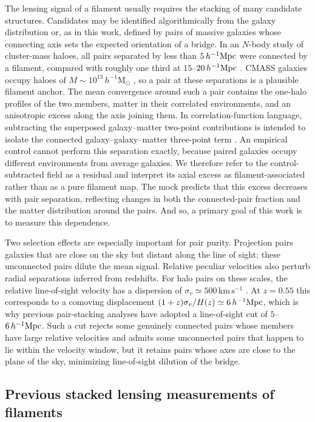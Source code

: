 \documentclass[preprint]{aastex701}
\newcommand{\hinvMpc}{h^{-1}{\rm Mpc}}
\begin{document}
The lensing signal of a filament usually requires the stacking of many candidate structures. Candidates may be identified algorithmically from
the galaxy distribution or, as in this work, defined by pairs of massive
galaxies whose connecting axis sets the expected orientation of a bridge. In
an $N$-body study of cluster-mass haloes, all pairs separated by less than
$5\,\hinvMpc$ were connected by a filament, compared with roughly one third
at $15$--$20\,\hinvMpc$ \citep{Colberg2005}.
CMASS galaxies occupy haloes of $M\sim10^{13}\,h^{-1}\mathrm{M}_{\odot}$
\citep{White2011}, so a pair at these separations is a plausible filament
anchor. The mean convergence around such a pair contains the one-halo
profiles of the two members, matter in their correlated environments, and an
anisotropic excess along the axis joining them. In correlation-function
language, subtracting the superposed galaxy--matter two-point contributions
is intended to isolate the connected galaxy--galaxy--matter three-point term
\citep{Clampitt2016}. An empirical control cannot perform this separation
exactly, because paired galaxies occupy different environments from average
galaxies. We therefore refer to the control-subtracted field as a residual
and interpret its axial excess as filament-associated rather than as a pure
filament map. The mock predicts that this excess decreases with pair
separation, reflecting changes in both the connected-pair fraction and the
matter distribution around the pairs. And so, a primary goal of this work is to measure this dependence.

Two selection effects are especially important for pair purity. Projection
pairs galaxies that are close on the sky but distant along the line of sight;
these unconnected pairs dilute the mean signal. Relative peculiar velocities
also perturb radial separations inferred from redshifts. For halo pairs on
these scales, the relative line-of-sight velocity has a dispersion of
$\sigma_{v}\simeq500\,\mathrm{km\,s^{-1}}$
\citep{Jenkins1998, deGraaff2019}. At $z=0.55$ this
corresponds to a comoving displacement $(1+z)\sigma_{v}/H(z)\simeq
6\,\hinvMpc$, which is why previous pair-stacking analyses have adopted a
line-of-sight cut of $5$--$6\,\hinvMpc$. Such a cut rejects some genuinely
connected pairs whose members have large relative velocities and admits some
unconnected pairs that happen to lie within the velocity window, but it
retains pairs whose axes are close to the plane of the sky, minimizing
line-of-sight dilution of the bridge.

\subsection{Previous stacked lensing measurements of filaments}
\end{document}
